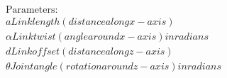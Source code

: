 \documentclass[preview]{standalone}
\begin{document}
\begin{align*}
\text{Parameters: } \\ a Link length (distance along x-axis) \\ \alpha Link twist (angle around x-axis) in radians \\ d Link offset (distance along z-axis) \\ \theta Joint angle (rotation around z-axis) in radians
\end{align*}
\end{document}

